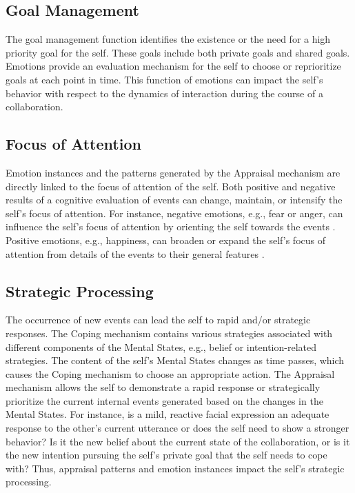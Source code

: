 \documentclass[12pt]{report}
\begin{document}
\subsection{Goal Management} The goal management function identifies the
existence or the need for a high priority goal for the self. These goals
include both private goals and shared goals. Emotions provide an evaluation
mechanism for the self to choose or reprioritize goals at each point in time.
This function of emotions can impact the self's behavior with respect to the
dynamics of interaction during the course of a collaboration.

\subsection{Focus of Attention} Emotion instances and the patterns generated
by the Appraisal mechanism are directly linked to the focus of attention of the
self. Both positive and negative results of a cognitive evaluation of events can
change, maintain, or intensify the self's focus of attention. For instance,
negative emotions, e.g., fear or anger, can influence the self's focus of
attention by orienting the self towards the events
\cite{faucher:fear-attention}. Positive emotions, e.g., happiness, can broaden
or expand the self's focus of attention from details of the events to their
general features \cite{fredrickson:positive-emotion-attention}.

\subsection{Strategic Processing} The occurrence of new events can lead the
self to rapid and/or strategic responses. The Coping mechanism contains various
strategies associated with different components of the Mental States, e.g.,
belief or intention-related strategies. The content of the self's Mental States
changes as time passes, which causes the Coping mechanism to choose an
appropriate action. The Appraisal mechanism allows the self to demonstrate a
rapid response or strategically prioritize the current internal events generated
based on the changes in the Mental States. For instance, is a mild, reactive
facial expression an adequate response to the other's current utterance or does
the self need to show a stronger behavior? Is it the new belief about the
current state of the collaboration, or is it the new intention pursuing the
self's private goal that the self needs to cope with? Thus, appraisal patterns
and emotion instances impact the self's strategic processing.
\end{document}
